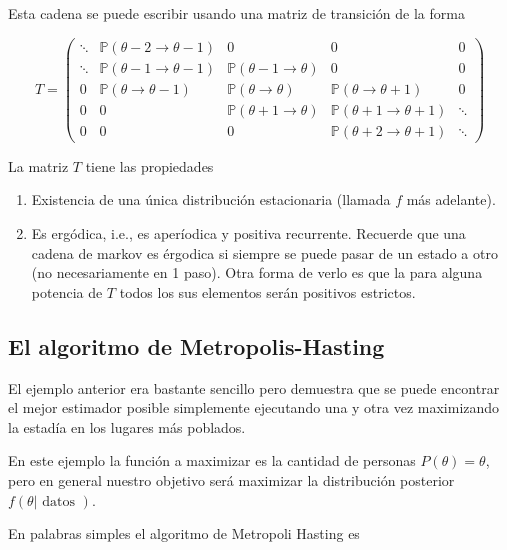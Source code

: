 \documentclass[
  12pt,
]{book}
\providecommand{\tightlist}{%
  \setlength{\itemsep}{0pt}\setlength{\parskip}{0pt}}
\theoremstyle{definition}
\theoremstyle{definition}
\theoremstyle{definition}
\theoremstyle{definition}
\theoremstyle{remark}
\begin{document}
Esta cadena se puede escribir usando una matriz de transición de la forma

\begin{equation*}
T= \left(\begin{array}{ccccc}
\ddots & \mathbb{P}(\theta-2 \rightarrow \theta-1) & 0 & 0 & 0 \\
\ddots & \mathbb{P}(\theta-1 \rightarrow \theta-1) & \mathbb{P}(\theta-1 \rightarrow \theta) & 0 & 0 \\
0 & \mathbb{P}(\theta \rightarrow \theta-1) & \mathbb{P}(\theta \rightarrow \theta) & \mathbb{P}(\theta \rightarrow \theta+1) & 0 \\
0 & 0 & \mathbb{P}(\theta+1 \rightarrow \theta) & \mathbb{P}(\theta+1 \rightarrow \theta+1) & \ddots \\
0 & 0 & 0 & \mathbb{P}(\theta+2 \rightarrow \theta+1) & \ddots
\end{array}\right)
\end{equation*}

La matriz \(T\) tiene las propiedades

\begin{enumerate}
\def\labelenumi{\arabic{enumi}.}
\tightlist
\item
  Existencia de una única distribución estacionaria (llamada \(f\) más adelante).
\item
  Es ergódica, i.e., es aperíodica y positiva recurrente. Recuerde que una cadena de markov es érgodica si siempre se puede pasar de un estado a otro (no necesariamente en 1 paso). Otra forma de verlo es que la para alguna potencia de \(T\) todos los sus elementos serán positivos estrictos.
\end{enumerate}

\hypertarget{el-algoritmo-de-metropolis-hasting}{%
\subsection{El algoritmo de Metropolis-Hasting}\label{el-algoritmo-de-metropolis-hasting}}

El ejemplo anterior era bastante sencillo pero demuestra que se puede
encontrar el mejor estimador posible simplemente ejecutando una y otra
vez maximizando la estadía en los lugares más poblados.

En este ejemplo la función a maximizar es la cantidad de personas
\(P(\theta)=\theta\), pero en general nuestro objetivo será maximizar
la distribución posterior \(f(\theta| \text{ datos })\).

En palabras simples el algoritmo de Metropoli Hasting es
\end{document}
